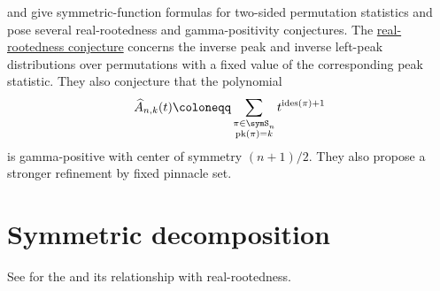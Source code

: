  and  \cite{GesselZhuang2024TwoSided}
give symmetric-function formulas for two-sided permutation statistics and
pose several real-rootedness and gamma-positivity conjectures.  The
\hyperref[conjInversePeaks]{real-rootedness conjecture} concerns the inverse
peak and inverse left-peak distributions over permutations with a fixed value
of the corresponding peak statistic.  They also conjecture that the
polynomial
\[
  \widehat{A}_{n,k}(t)
  \coloneqq
  \sum_{\substack{\pi\in\symS_n\\ \operatorname{pk}(\pi)=k}}
  t^{\operatorname{ides}(\pi)+1}
\]
is gamma-positive with center of symmetry $(n+1)/2$. They also propose a
stronger refinement by fixed pinnacle set.





\section[symmetricDecomposition]{Symmetric decomposition}

See \cite{BrandenSolus2019} for the 
and its relationship with real-rootedness.

